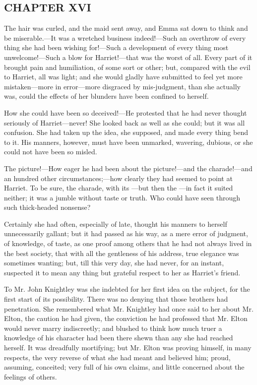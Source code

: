 \subsection[chapter-xvi]{\useURL[url16][][][]\from[url16]CHAPTER XVI}

The hair was curled, and the maid sent away, and Emma sat down to think and be miserable.---It was a wretched business indeed!---Such an overthrow of every thing she had been wishing for!---Such a development of every thing most unwelcome!---Such a blow for Harriet!---that was the worst of all. Every part of it brought pain and humiliation, of some sort or other; but, compared with the evil to Harriet, all was light; and she would gladly have submitted to feel yet more mistaken---more in error---more disgraced by mis-judgment, than she actually was, could the effects of her blunders have been confined to herself.


How she could have been so deceived!---He protested that he had never thought seriously of Harriet---never! She looked back as well as she could; but it was all confusion. She had taken up the idea, she supposed, and made every thing bend to it. His manners, however, must have been unmarked, wavering, dubious, or she could not have been so misled.

The picture!---How eager he had been about the picture!---and the charade!---and an hundred other circumstances;---how clearly they had seemed to point at Harriet. To be sure, the charade, with its ---but then the ---in fact it suited neither; it was a jumble without taste or truth. Who could have seen through such thick-headed nonsense?

Certainly she had often, especially of late, thought his manners to herself unnecessarily gallant; but it had passed as his way, as a mere error of judgment, of knowledge, of taste, as one proof among others that he had not always lived in the best society, that with all the gentleness of his address, true elegance was sometimes wanting; but, till this very day, she had never, for an instant, suspected it to mean any thing but grateful respect to her as Harriet's friend.

To Mr. John Knightley was she indebted for her first idea on the subject, for the first start of its possibility. There was no denying that those brothers had penetration. She remembered what Mr. Knightley had once said to her about Mr. Elton, the caution he had given, the conviction he had professed that Mr. Elton would never marry indiscreetly; and blushed to think how much truer a knowledge of his character had been there shewn than any she had reached herself. It was dreadfully mortifying; but Mr. Elton was proving himself, in many respects, the very reverse of what she had meant and believed him; proud, assuming, conceited; very full of his own claims, and little concerned about the feelings of others.

